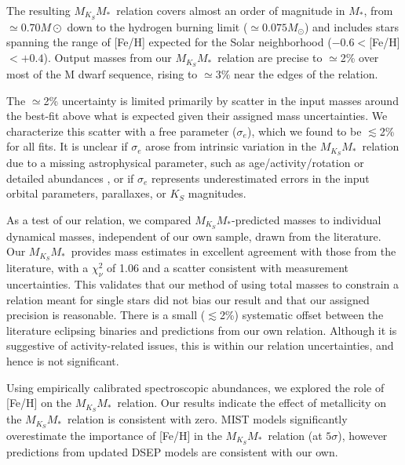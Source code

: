 \documentclass[twocolumn]{aastex62}
\newcommand{\mks}{$M_{K_S}$}
\newcommand{\mmk}{$M_{K_S}$\textendash$M_*$}
\begin{document}
The resulting \mmk\ relation covers almost an order of magnitude in $M_*$, from $\simeq0.70M\odot$ down to the hydrogen burning limit ($\simeq0.075M_\odot$) and includes stars spanning the range of [Fe/H] expected for the Solar neighborhood ($-0.6<$[Fe/H]$<+0.4$). Output masses from our \mmk\ relation are precise to $\simeq$2\% over most of the M dwarf sequence, rising to $\simeq3\%$ near the edges of the relation. 

The $\simeq$2\% uncertainty is limited primarily by scatter in the input masses around the best-fit above what is expected given their assigned mass uncertainties. We characterize this scatter with a free parameter ($\sigma_e$), which we found to be $\lesssim$2\% for all fits. It is unclear if $\sigma_e$ arose from intrinsic variation in the \mmk\ relation due to a missing astrophysical parameter, such as age/activity/rotation \citep[e.g.,][]{Kraus2011,Feiden:2016aa,Somers2017} or detailed abundances \citep[e.g.,][]{2017A&A...604A..97L,Veyette2017}, or if $\sigma_e$ represents underestimated errors in the input orbital parameters, parallaxes, or $K_S$ magnitudes. %

As a test of our relation, we compared \mmk-predicted masses to individual dynamical masses, independent of our own sample, drawn from the literature. Our \mmk\ provides mass estimates in excellent agreement with those from the literature, with a $\chi^2_\nu$ of 1.06 and a scatter consistent with measurement uncertainties. This validates that our method of using total masses to constrain a relation meant for single stars did not bias our result and that our assigned precision is reasonable. There is a small ($\lesssim$2\%) systematic offset between the literature eclipsing binaries and predictions from our own relation. Although it is suggestive of activity-related issues, this is within our relation uncertainties, and hence is not significant.

Using empirically calibrated spectroscopic abundances, we explored the role of [Fe/H] on the \mmk\ relation. Our results indicate the effect of metallicity on the \mmk\ relation is consistent with zero. MIST models significantly overestimate the importance of [Fe/H] in the \mmk\ relation (at $5\sigma$), however predictions from updated DSEP models are consistent with our own. %
\end{document}
